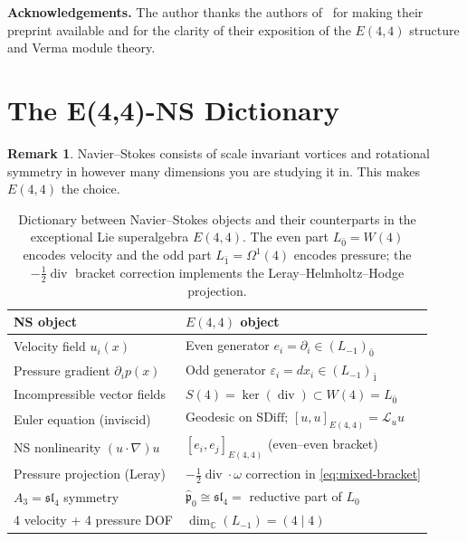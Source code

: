 \documentclass[reqno,10pt]{amsart}
\theoremstyle{definition}
\newtheorem{rem}[subsubsection]{Remark}
\def\Wn{W(4)}
\def\Sn{S(4)}
\def\Cset{{\mathbb{C}}}
\def\divX{{\operatorname{div}}}
\def\phat{\hat{\mathfrak{p}}}
\def\slN{{\mathfrak{sl}}_4}
\begin{document}
\medskip
\noindent\textbf{Acknowledgements.}
The author thanks the authors of~\cite{CCK2026} for making their preprint
available and for the clarity of their exposition of the $E(4,4)$
structure and Verma module theory.

\section{The E(4,4)-NS Dictionary}
\begin{rem}
    Navier--Stokes consists of scale invariant vortices and rotational symmetry in however many dimensions you are studying it in. This makes $E(4,4)$ the choice. 
\end{rem}
\label{sec:dictionary}
% 

\begin{table}[ht]
\centering
\renewcommand{\arraystretch}{1.35}
\begin{tabular}{p{4.5cm} p{9cm}}
\toprule
\textbf{NS object} & \textbf{$E(4,4)$ object} \\
\midrule
Velocity field $u_i(x)$ &
  Even generator $e_i = \partial_i \in (L_{-1})_{\bar 0}$ \\
Pressure gradient $\partial_i p(x)$ &
  Odd generator $\varepsilon_i = dx_i \in (L_{-1})_{\bar 1}$ \\
Incompressible vector fields &
  $\Sn = \ker(\operatorname{div})\subset\Wn = L_{\bar 0}$ \\
Euler equation (inviscid) &
  Geodesic on $\mathrm{SDiff}$; $[u,u]_{E(4,4)} = \mathcal{L}_u u$ \\
NS nonlinearity $(u\cdot\nabla)u$ &
  $[e_i, e_j]_{E(4,4)}$ (even--even bracket) \\
Pressure projection (Leray) &
  $-\tfrac 12\divX \cdot\omega$ correction in \eqref{eq:mixed-bracket} \\
$A_3 = \mathfrak{sl}_4$ symmetry &
  $\phat_0 \cong \slN = $ reductive part of $L_0$ \\
4 velocity + 4 pressure DOF &
  $\dim_\Cset(L_{-1}) = (4\mid 4)$ \\
\bottomrule
\end{tabular}
\caption{Dictionary between Navier--Stokes objects and their counterparts
in the exceptional Lie superalgebra $E(4,4)$.  The even part $L_{\bar 0}=W(4)$
encodes velocity and the odd part $L_{\bar 1}=\Omega^1(4)$ encodes pressure;
the $-\tfrac{1}{2}\operatorname{div}$ bracket correction implements the
Leray--Helmholtz--Hodge projection.}
\label{tab:dictionary}
\end{table}
\end{document}
